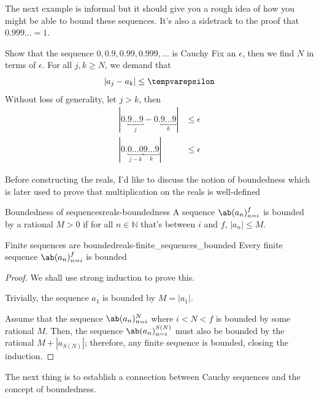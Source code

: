 The next example is informal but it should give you a rough idea of how you might be
able to bound these sequences. It's also a sidetrack to the proof that \(0.999\dots = 1\).

\begin{exmp}{Show that the sequence \(0, 0.9, 0.99, 0.999, \dots\) is Cauchy}{}
  Fix an \(\epsilon\), then we find \(N\) in terms of \(\epsilon\). For all \(j, k \geq N\),
  we demand that
  \begin{equation}
    |a_j - a_k| \leq \epsilon \\
  \end{equation}
  Without loss of generality, let \(j > k\), then
  \begin{align}
    |0.\underbracket{9...9}_j - 0.\underbracket{9 \dots 9}_k|  & \leq \epsilon \\
    |0.\underbracket{0...0}_{j-k}\underbracket{9 \dots 9}_{k}| & \leq \epsilon
  \end{align}
\end{exmp}

Before constructing the reals, I'd like to discuss the notion of boundedness which is
later used to prove that multiplication on the reals is well-defined

\begin{df}{Boundedness of sequences}{reals-boundedness}
  A sequence $\sequence{a_n}{n = i}{f}$ is bounded by a rational $M > 0$ if for all
  $n \in \mathbb{N}$ that's between $i$ and $f$, $|a_n| \leq M$.
\end{df}

\begin{cor}{Finite sequences are bounded}{reals-finite_sequences_bounded}
  Every finite sequence $\sequence{a_n}{n = i}{f}$ is bounded
\end{cor}
\begin{proof}
  We shall use strong induction to prove this.

  \basecase Trivially, the sequence $a_1$ is bounded by $M = |a_1|$.

  \inductivestep Assume that the sequence $\sequence{a_n}{n = i}{N}$ where $i < N < f$ is bounded
  by some rational $M$. Then, the sequence $\sequence{a_n}{n = i}{S(N)}$ must also be bounded by
  the rational $M + |a_{S(N)}|$; therefore, any finite sequence is bounded, closing the induction.
\end{proof}

The next thing is to establish a connection between Cauchy sequences and the concept of boundedness.

